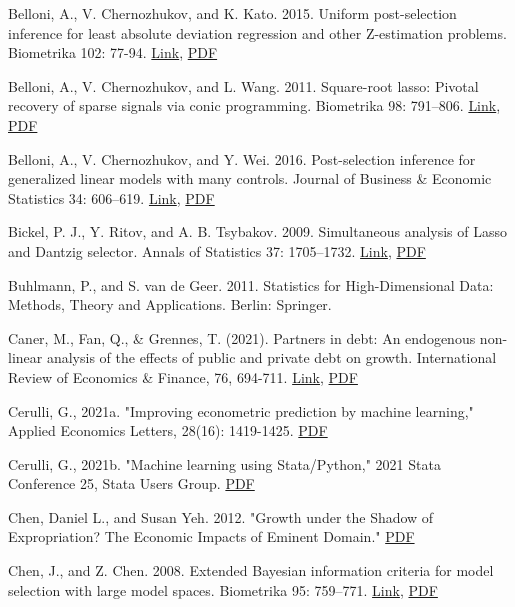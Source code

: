 {Belloni, A., V. Chernozhukov, and K. Kato. 2015. Uniform post-selection inference for least absolute deviation regression and other Z-estimation problems. Biometrika 102: 77-94. \href{https://doi.org/10.1093/biomet/asu056}{Link}, \href{http://sci-hub.ren/10.1093/biomet/asu056}{PDF}

Belloni, A., V. Chernozhukov, and L. Wang. 2011. Square-root lasso: Pivotal recovery of sparse signals via conic programming. Biometrika 98: 791–806. \href{https://doi.org/10.1093/biomet/asr043}{Link}, \href{http://sci-hub.ren/10.1093/biomet/asr043}{PDF}

Belloni, A., V. Chernozhukov, and Y. Wei. 2016. Post-selection inference for generalized linear models with many controls. Journal of Business \& Economic Statistics 34: 606–619.  \href{https://doi.org/10.1080/07350015.2016.1166116}{Link}, \href{http://sci-hub.ren/10.1080/07350015.2016.1166116}{PDF}


Bickel, P. J., Y. Ritov, and A. B. Tsybakov. 2009. Simultaneous analysis of Lasso and Dantzig selector. Annals of
Statistics 37: 1705–1732. \href{https://doi.org/10.1214/08-A}{Link}, \href{http://sci-hub.ren/10.1214/08-A}{PDF}

Buhlmann, P., and S. van de Geer. 2011. Statistics for High-Dimensional Data: Methods, Theory and Applications.
Berlin: Springer.

Caner, M., Fan, Q., \& Grennes, T. (2021). Partners in debt: An endogenous non-linear analysis of the effects of public and private debt on growth. International Review of Economics \& Finance, 76, 694-711. \href{https://doi.org/10.1016/j.iref.2021.07.010}{Link}, \href{http://sci-hub.ren/10.1016/j.iref.2021.07.010}{PDF}

Cerulli, G., 2021a. "Improving econometric prediction by machine learning," Applied Economics Letters, 28(16): 1419-1425. \href{http://sci-hub.ren/10.1080/13504851.2020.1820939}{PDF}

Cerulli, G., 2021b. "Machine learning using Stata/Python," 2021 Stata Conference 25, Stata Users Group. \href{https://arxiv.org/pdf/2103.03122.pdf}{PDF}

Chen, Daniel L., and Susan Yeh. 2012. "Growth under the Shadow of Expropriation? The Economic Impacts of Eminent Domain." \href{http:// www.sole-jole.org/13463.pdf}{PDF}

Chen, J., and Z. Chen. 2008. Extended Bayesian information criteria for model selection
with large model spaces. Biometrika 95: 759–771. \href{https://doi.org/10.1093/biomet/asn034}{Link}, \href{http://sci-hub.ren/10.1093/biomet/asn034}{PDF}

}
